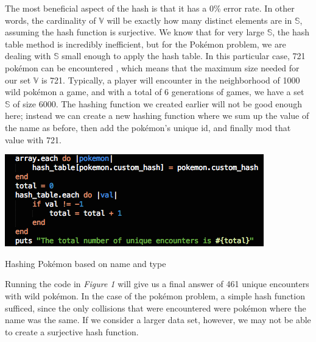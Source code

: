\documentclass{article}
\begin{document}
\indent The most beneficial aspect of the hash is that it has a 0\% error rate. 
In other words, the cardinality of $\mathbb{V}$ will be exactly how many distinct elements are in $\mathbb{S}$, assuming the hash function is surjective. 
We know that for very large $\mathbb{S}$, the hash table method is incredibly inefficient, but for the Pok\'emon problem, we are dealing with $\mathbb{S}$ small enough to apply the hash table. 
In this particular case, 721 pok\'emon can be encountered \cite{Pokemon}, which means that the maximum size needed for our set $\mathbb{V}$ is 721. 
Typically, a player will encounter in the neighborhood of 1000 wild pok\'emon a game, and with a total of 6 generations of games, we have a set $\mathbb{S}$ of size 6000. 
The hashing function we created earlier will not be good enough here; instead we can create a new hashing function where we sum up the value of the name as before, then add the pok\'emon's unique id, and finally mod that value with 721.
\begin{floatingfigure}[H!]{8cm}
\centering
\begin{framed}
\includegraphics[scale=0.4]{pkmn_problem/hash_01}
\caption{Hashing Pok\'emon based on name and type}
\end{framed}
\end{floatingfigure}
\noindent Running the code in \textit{Figure 1} will give us a final answer of 461 unique encounters with wild pok\'emon. 
In the case of the pok\'emon problem, a simple hash function sufficed, since the only collisions that were encountered were pok\'emon where the name was the same. 
If we consider a larger data set, however, we may not be able to create a surjective hash function.\\
\end{document}
